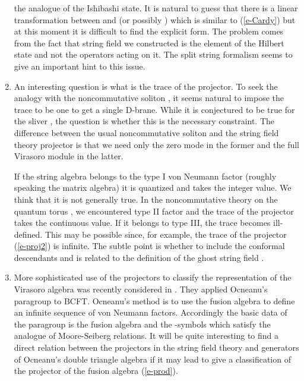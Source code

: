 \documentclass[a4paper,12pt]{article}
\begin{document}
\begin{enumerate}
the analogue of the Ishibashi state.
It is natural to guess
that there is a linear transformation 
between \coordHE{} and \coordHE{} (or possibly \coordHE{}) 
which is similar to (\ref{e-Cardy})
but at this moment it is difficult
to find the explicit form.
The problem comes from the fact that string field we constructed
is the element of the Hilbert state and not 
the operators acting on it.  The split string formalism
\cite{r-Witten,r-RSZ2,r-GT,r-KO} seems to give an important hint to this issue.
\item An interesting question is what is the trace
of the projector. To seek the analogy with the noncommutative
soliton \cite{r-HKLM}, it seems natural to impose the trace to 
be one to get a single D-brane.
While it is conjectured to be true for the sliver \cite{r-RSZ1,r-RSZ2},
the question is  whether this is the necessary constraint.
The difference between the usual noncommutative
soliton and the string field theory projector
is that we need only the zero mode in the former and
the full Virasoro module in the latter.

If the string algebra belongs to the
type I von Neumann factor (roughly speaking the matrix algebra)
it is quantized and takes the integer value.  We think that it
is not generally true.  In the noncommutative theory on the
quantum torus \cite{r-qtorus}, we encountered type II factor
and the trace of the projector 
takes the continuous value.  If it belongs to
type III, the trace becomes ill-defined.  This may be possible
since, for example,
the trace of the projector (\ref{e-proj2}) is infinite.
The subtle point is whether to include the conformal descendants
and is related to the definition of the ghost string field
\cite{r-RSZ1, r-RSZ2}.
\item More sophisticated use of the projectors to classify the 
representation of the Virasoro algebra was recently considered
in \cite{r-PZ}. They applied Ocneanu's paragroup 
\cite{r-Ocneanu,r-subfactors}
to BCFT. Ocneanu's method is to use the
fusion algebra to define an infinite sequence of von Neumann factors.
Accordingly the basic data of the paragroup is the fusion
algebra and the \coordHE{}-symbols which satisfy the analogue of
Moore-Seiberg relations\cite{r-MS}. It will be quite interesting
to find a direct relation between the projectors in the string
field theory and generators of Ocneanu's double triangle algebra
\cite{r-PZ} if it may lead to give a classification of the projector
of the fusion algebra (\ref{e-prod}).
\end{enumerate}
\end{document}
